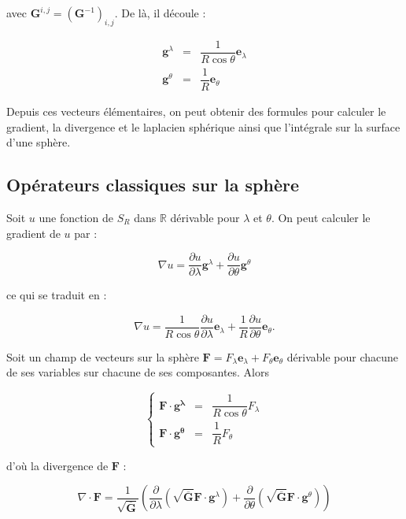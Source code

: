 avec $\mathbf{G}^{i,j} = \left( \mathbf{G}^{-1} \right)_{i,j}$.
De là, il découle :

\begin{equation}
\begin{array}{rcl}
\mathbf{g}^{\lambda} & = & \dfrac{1}{R \cos \theta}  \mathbf{e}_{\lambda} \\
\mathbf{g}^{\theta} & = & \dfrac{1}{R} \mathbf{e}_{\theta}
\end{array}
\end{equation}

Depuis ces vecteurs élémentaires, on peut obtenir des formules pour calculer le gradient, la divergence et le laplacien sphérique ainsi que l'intégrale sur la surface d'une sphère.

\subsection{Opérateurs classiques sur la sphère}

Soit $u$ une fonction de $S_R$ dans $\mathbb{R}$ dérivable pour $\lambda$ et $\theta$. On peut calculer le gradient de $u$ par :

\begin{equation}
\nabla u = \dfrac{\partial u}{\partial \lambda} \mathbf{g}^{\lambda} + \dfrac{\partial u}{\partial \theta} \mathbf{g}^{\theta}
\end{equation}

ce qui se traduit en :

\begin{equation}\label{gradient_lonlat}
\nabla u = \dfrac{1}{R \cos \theta}\dfrac{\partial u}{\partial \lambda} \mathbf{e}_{\lambda} + \dfrac{1}{R} \dfrac{\partial u}{\partial \theta} \mathbf{e}_{\theta}.
\end{equation}

Soit un champ de vecteurs sur la sphère $\mathbf{F} = F_{\lambda} \mathbf{e}_{\lambda} + F_{\theta} \mathbf{e}_{\theta}$ dérivable pour chacune de ses variables sur chacune de ses composantes. Alors 

$$
\left\lbrace 
\begin{array}{rcl}
\mathbf{F} \cdot \mathbf{g^{\lambda}} & = & \dfrac{1}{R \cos \theta} F_{\lambda} \\
\mathbf{F} \cdot \mathbf{g^{\theta}} & = & \dfrac{1}{R} F_{\theta}
\end{array}
\right.
$$

d'où la divergence de $\mathbf{F}$ :

\begin{equation}
\nabla \cdot \mathbf{F} = \dfrac{1}{\sqrt{\overline{\mathbf{G}}}} \left( \dfrac{\partial}{\partial \lambda} \left( \sqrt{\overline{\mathbf{G}}} \mathbf{F} \cdot \mathbf{g}^{\lambda}  \right) +  \dfrac{\partial}{\partial \theta} \left( \sqrt{\overline{\mathbf{G}}} \mathbf{F} \cdot \mathbf{g}^{\theta}  \right)  \right)
\end{equation}

